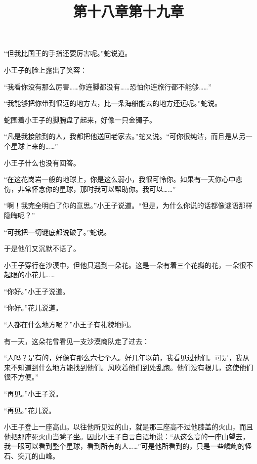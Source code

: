 “但我比国王的手指还要厉害呢。”蛇说道。

小王子的脸上露出了笑容：

“我看你没有那么厉害\ldots{}\ldots{}你连脚都没有\ldots{}\ldots{}恐怕你连旅行都不能够\ldots{}\ldots{}”

“我能够把你带到很远的地方去，比一条海船能去的地方还远呢。”蛇说。

蛇围着小王子的脚腕盘了起来，好像一只金镯子。

“凡是我接触到的人，我都把他送回老家去。”蛇又说。“可你很纯洁，而且是从另一个星球上来的\ldots{}\ldots{}”

小王子什么也没有回答。

“在这花岗岩一般的地球上，你是这么弱小，我很可怜你。如果有一天你心中悲伤，非常怀念你的星球，那时我可以帮助你。我可以\ldots{}\ldots{}”

“啊！我完全明白了你的意思。”小王子说道。“但是，为什么你说的话都像谜语那样隐晦呢？”

“可我把一切谜底都说破了。”蛇说。

于是他们又沉默不语了。

\title{第十八章}

小王子穿行在沙漠中，但他只遇到一朵花。这是一朵有着三个花瓣的花，一朵很不起眼的小花儿\ldots{}\ldots{}

{\startalignment[center]
 \stopalignment}

“你好。”小王子说道。

“你好。”花儿说道。

“人都在什么地方呢？”小王子有礼貌地问。

有一天，这朵花曾看见一支沙漠商队走了过去：

“人吗？是有的，好像有那么六七个人。好几年以前，我看见过他们。可是，我从来不知道到什么地方能找到他们。风吹着他们到处乱跑。他们没有根儿，这使他们很不方便。”

“再见。”小王子说。

“再见。”花儿说。

\title{第十九章}

小王子登上一座高山。以往他所见过的山，就是那三座高不过他膝盖的火山，而且他把那座死火山当凳子坐。因此小王子自言自语地说：“从这么高的一座山望去，我一眼可以看到整个星球，看到所有的人\ldots{}\ldots{}”可是他所看到的，只是一些嶙峋的怪石、突兀的山峰。

{\startalignment[center]
 \stopalignment}

